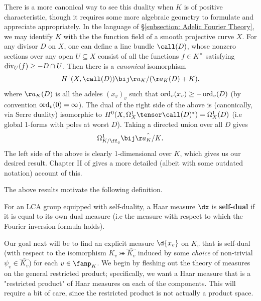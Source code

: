 \documentclass[11pt, x11names, openany]{book}
\begin{document}
\begin{remark}
There is a more canonical way to see this duality when $K$ is of positive characteristic, though it requires some more algebraic geometry to formulate and appreciate appropriately. In the language of \S \ref{subsection: Adelic Fourier Theory}, we may identify $K$ with the the function field of a smooth projective curve $X$. For any divisor $D$ on $X$, one can define a line bundle $\call(D)$, whose nonzero sections over any open $U \subseteq X$ consist of all the functions $f \in K^\times$ satisfying $\operatorname{div}_U(f) \geq -D \cap U$. Then there is a \textit{canonical} isomorphism
\begin{equation*}
    H^1(X, \call(D)) \bij \aa_K/(\aa_K(D) + K),
\end{equation*}
where $\aa_K(D)$ is all the adeles $(x_v)_v$ such that $\operatorname{ord}_v(x_v) \geq - \operatorname{ord}_v(D)$ (by convention $\operatorname{ord}_v(0) = \infty$). The dual of the right side of the above is (canonically, via Serre duality) isomorphic to $H^0(X, \Omega^1_X \tensor \call(D)^*) = \Omega^1_X(D)$ (i.e global 1-forms with poles at worst $D$). Taking a directed union over all $D$ gives
\begin{equation*}
   \Omega^1_{K/\ff_q} \bij \hat{\aa_K/K}. 
\end{equation*}
The left side of the above is clearly 1-dimensional over $K$, which gives us our desired result. Chapter II of \cite{serre2012algebraic} gives a more detailed (albeit with some outdated notation) account of this.
\end{remark}

The above results motivate the following definition.


\begin{defn}
    \label{def: self-dual measure}
For an LCA group equipped with self-duality, a Haar measure $\dx$ is \textbf{self-dual} if it is equal to its own dual measure (i.e the measure with respect to which the Fourier inversion formula holds).
\end{defn}

Our goal next will be to find an explicit measure $\d{x_v}$ on $K_v$ that is self-dual (with respect to the isomorphism $K_v \bij \hat{K_v}$ induced by some \textit{choice} of non-trivial $\psi_v \in \hat{K_v}$) for each $v \in \fanp_K$. We begin by fleshing out the theory of measures on the general restricted product; specifically, we want a Haar measure that is a "restricted product" of Haar measures on each of the components. This will require a bit of care, since the restricted product is not actually a product space.
\end{document}
